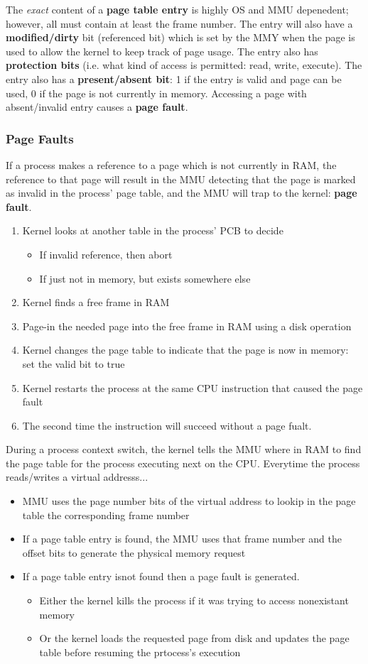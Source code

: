 \documentclass{article}
\newcommand{\bold}[1]{\textbf{#1}}
\renewcommand{\b}{\item[$\circ$]}
\newcommand{\newlist}{\begin{itemize}}
\renewcommand{\endlist}{\end{itemize}}
\begin{document}
The \emph{exact} content of a \bold{page table entry} is highly OS and MMU depenedent; however, all must contain at least the frame number. The entry will also have a \bold{modified/dirty} bit (referenced bit) which is set by the MMY when the page is used to allow the kernel to keep track of page usage. The entry also has \bold{protection bits} (i.e. what kind of access is permitted: read, write, execute). The entry also has a \bold{present/absent bit}: 1 if the entry is valid and page can be used, 0 if the page is not currently in memory. Accessing a page with absent/invalid entry causes a \bold{page fault}. 

\subsubsection{Page Faults}

If a process makes a reference to a page which is not currently in RAM, the reference to that page will result in the MMU detecting that the page is marked as invalid in the process' page table, and the MMU will trap to the kernel: \bold{page fault}. 

\begin{enumerate}
    \item Kernel looks at another table in the process' PCB to decide
        \newlist 
        \b If invalid reference, then abort
        \b If just not in memory, but exists somewhere else
        \endlist
    \item Kernel finds a free frame in RAM
    \item Page-in the needed page into the free frame in RAM using a disk operation
    \item Kernel changes the page table to indicate that the page is now in memory: set the valid bit to true
    \item Kernel restarts the process at the same CPU instruction that caused the page fault
    \item The second time the instruction will succeed without a page fualt. 
\end{enumerate}

During a process context switch, the kernel tells the MMU where in RAM to find the page table for the process executing next on the CPU. Everytime the process reads/writes a virtual addresss...

\newlist 
\b MMU uses the page number bits of the virtual address to lookip in the page table the corresponding frame number
\b If a page table entry is found, the MMU uses that frame number and the offset bits to generate the physical memory request 
\b If a page table entry isnot found then a page fault is generated. 
\newlist 
\b Either the kernel kills the process if it was trying to access nonexistant memory
\b Or the kernel loads the requested page from disk and updates the page table before resuming the prtocess's execution
\endlist
\endlist
\end{document}
